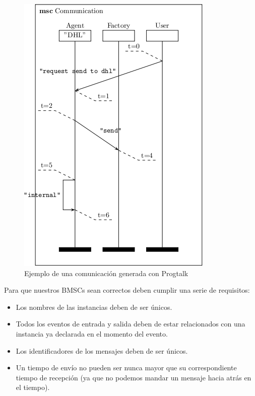 \begin{figure}
  \centering
  \includegraphics[scale=1]{./images/lars.png}
  \caption{Ejemplo de una comunicación generada con Progtalk}
  \label{fig:lars}
\end{figure}

Para que nuestros BMSCs sean correctos deben cumplir una serie de
requisitos:
\begin{itemize}
\item Los nombres de las instancias deben de ser únicos.
\item Todos los eventos de entrada y salida deben de estar
  relacionados con una instancia ya declarada en el momento del
  evento.
\item Los identificadores de los mensajes deben de ser únicos.
\item Un tiempo de envío no pueden ser nunca mayor que su
  correspondiente tiempo de recepción (ya que no podemos mandar un
  mensaje hacia atrás en el tiempo).
\end{itemize}

